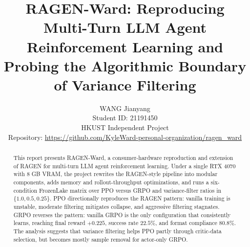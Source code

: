 \documentclass[11pt]{article}
\title{RAGEN-Ward: Reproducing Multi-Turn LLM Agent Reinforcement Learning and Probing the Algorithmic Boundary of Variance Filtering}
\author{
WANG Jianyang \\
Student ID: 21191450 \\
HKUST Independent Project \\
Repository: \url{https://github.com/KyleWard-personal-organization/ragen_ward}
}
\newcommand{\method}{RAGEN-Ward}
\begin{document}
\raggedbottom
\maketitle

\begin{abstract}
This report presents \method, a consumer-hardware reproduction and extension of RAGEN for multi-turn LLM agent reinforcement learning. Under a single RTX 4070 with 8 GB VRAM, the project rewrites the RAGEN-style pipeline into modular components, adds memory and rollout-throughput optimizations, and runs a six-condition FrozenLake matrix over PPO versus GRPO and variance-filter ratios in \(\{1.0, 0.5, 0.25\}\). PPO directionally reproduces the RAGEN pattern: vanilla training is unstable, moderate filtering mitigates collapse, and aggressive filtering stagnates. GRPO reverses the pattern: vanilla GRPO is the only configuration that consistently learns, reaching final reward \(+0.225\), success rate \(22.5\%\), and format compliance \(80.8\%\). The analysis suggests that variance filtering helps PPO partly through critic-data selection, but becomes mostly sample removal for actor-only GRPO.
\end{abstract}











\appendix

\end{document}
